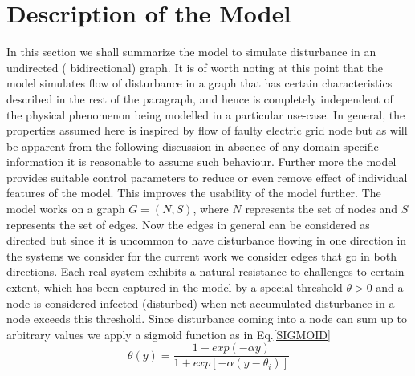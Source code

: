 \documentclass[11pt]{article}
\begin{document}
\section{Description of the Model}
In this section we shall summarize the model to simulate disturbance in an undirected ( bidirectional) graph. It is of worth noting at this point that the model simulates flow of disturbance in a graph that has certain characteristics described in the rest of the paragraph, and hence is completely independent of the physical phenomenon being modelled in a particular use-case. In general, the properties assumed here is inspired by flow of faulty electric grid node but as will be apparent from the following discussion in absence of any domain specific information it is reasonable to assume such behaviour. Further more the model provides suitable control parameters to reduce or even remove effect of individual features of the model. This improves the usability of the model further. The model works on a graph $G = (N, S)$, where $N$ represents the set of nodes and $S$ represents the set of edges. Now the edges in general can be considered as directed but since it is uncommon to have disturbance flowing in one direction in the systems we consider for the current work we consider edges that go in both directions. Each real system exhibits a natural resistance to challenges to certain extent, which has been captured in the model by a special threshold $\theta > 0$ and a node is considered infected (disturbed) when net accumulated disturbance in a node exceeds this threshold. Since disturbance coming into a node can sum up to arbitrary values we apply a sigmoid function as in Eq.\ref{SIGMOID}
\begin{equation}
\theta(y) = \frac{1-exp(-\alpha y)}{1+exp[-\alpha(y-\theta_i)]} 
\label{SIGMOID}
\end{equation}
\end{document}
